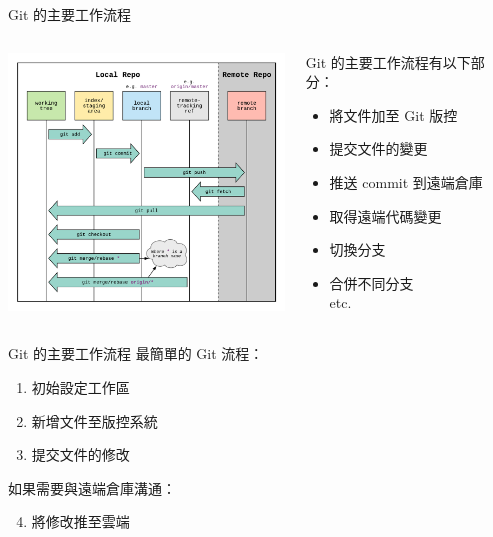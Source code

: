\documentclass[xetex, unicode, 10pt, aspectratio=169]{beamer}
\begin{document}
\begin{frame}{Git 的主要工作流程}
    \begin{columns}
        \begin{column}{0.6\textwidth}
            \begin{center}
                \includegraphics[height=2.7in]{./img/git-workflow.png}
            \end{center}
        \end{column}
        \begin{column}{0.4\textwidth}
            Git 的主要工作流程有以下部分：
            \pause
            \begin{itemize}
                \item 將文件加至 Git 版控
                \item 提交文件的變更
                \item 推送 commit 到遠端倉庫
                \item 取得遠端代碼變更
                \item 切換分支
                \item 合併不同分支\\
                    etc.
            \end{itemize}
        \end{column}
    \end{columns}
\end{frame}

\begin{frame}{Git 的主要工作流程}
    最簡單的 Git 流程：
    \begin{enumerate}
        \item 初始設定工作區
        \item 新增文件至版控系統
        \item 提交文件的修改
    \end{enumerate}

    如果需要與遠端倉庫溝通：
    \begin{enumerate}
            \setcounter{enumi}{3}
        \item 將修改推至雲端
    \end{enumerate}
\end{frame}
\end{document}
